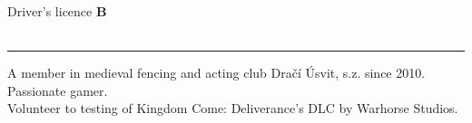 \documentclass[a4paper,11pt]{article}
\begin{document}
\begin{paracol}{2}
\begin{rightcolumn}
        \vspace{20pt}
        \begin{parcolumns}{2}
        \end{parcolumns}
        
        

        \vspace{28pt}
        Driver's licence \textbf{B} \\ \\
        \rule{\linewidth}{0.5pt}

        \vspace{18pt}
        A member in medieval fencing and acting club Dračí Úsvit, s.z. since 2010.\\
        Passionate gamer.\\
        Volunteer to testing of Kingdom Come: Deliverance's DLC by Warhorse Studios.

    \end{rightcolumn}
\end{paracol}
\end{document}
